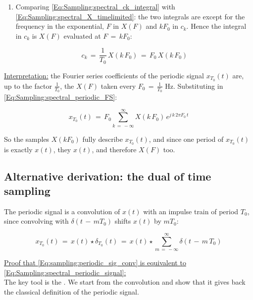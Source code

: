 \begin{enumerate}
\item Comparing \autoref{Eq:Sampling:spectral_ck_integral} with \autoref{Eq:Sampling:spectral_X_timelimited}: the two integrals are  except for the frequency in the exponential, $F$ in $X(F)$ and $k F_0$ in $c_k$. Hence the integral in $c_k$ is $X(F)$ evaluated at $F \, = \, k F_0$:

\begin{equation}
\boxed{
c_k \, = \, \frac{1}{T_0} \, X(k \, F_0) \, = \, F_0 \, X(k \, F_0)
}
\label{Eq:Sampling:spectral_ck_samples}
\end{equation}

\end{enumerate}

\underline{Interpretation:} the Fourier series coefficients of the periodic signal $x_{T_0}(t)$ are, up to the factor $\frac{1}{T_0}$, the  $X(F)$ taken every $F_0 \, = \, \frac{1}{T_0}$ Hz. Substituting in \autoref{Eq:Sampling:spectral_periodic_FS}:

\begin{equation}
x_{T_0}(t) \, = \, F_0 \sum_{k \, = \, -\infty}^{\infty} X(k \, F_0) \, e^{j \, k \, 2 \pi F_0 \, t}
\label{Eq:Sampling:spectral_periodic_from_samples}
\end{equation}

So the samples $X(k F_0)$ fully describe $x_{T_0}(t)$, and since one period of $x_{T_0}(t)$ is exactly $x(t)$, they  $x(t)$, and therefore $X(F)$ too.

\subsection{Alternative derivation: the dual of time sampling}

The periodic signal is a convolution of $x(t)$ with an impulse train of period $T_0$, since convolving with $\delta(t \, - \, m T_0)$ shifts $x(t)$ by $m T_0$:

\begin{equation}
x_{T_0}(t) \, = \, x(t) \star \delta_{T_0}(t) \, = \, x(t) \star \sum_{m \, = \, -\infty}^{\infty} \delta(t \, - \, m \, T_0)
\label{Eq:sampling:periodic_sig_conv}
\end{equation}

\underline{Proof that \autoref{Eq:sampling:periodic_sig_conv} is equivalent to \autoref{Eq:Sampling:spectral_periodic_signal}:}\\

The key tool is the . We start from the convolution and show that it gives back the classical definition of the periodic signal.

